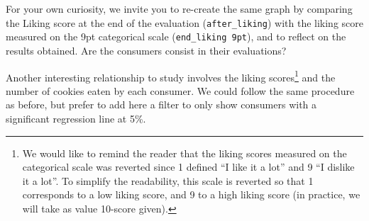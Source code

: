 \documentclass[
]{book}
\newenvironment{Shaded}{\begin{snugshade}}{\end{snugshade}}
\newcommand{\AttributeTok}[1]{\textcolor[rgb]{0.77,0.63,0.00}{#1}}
\newcommand{\ConstantTok}[1]{\textcolor[rgb]{0.00,0.00,0.00}{#1}}
\newcommand{\DecValTok}[1]{\textcolor[rgb]{0.00,0.00,0.81}{#1}}
\newcommand{\FunctionTok}[1]{\textcolor[rgb]{0.00,0.00,0.00}{#1}}
\newcommand{\NormalTok}[1]{#1}
\newcommand{\SpecialCharTok}[1]{\textcolor[rgb]{0.00,0.00,0.00}{#1}}
\newcommand{\StringTok}[1]{\textcolor[rgb]{0.31,0.60,0.02}{#1}}
\begin{document}
\begin{Shaded}
\end{Shaded}

For your own curiosity, we invite you to re-create the same graph by comparing the Liking score at the end of the evaluation (\texttt{after\_liking}) with the liking score measured on the 9pt categorical scale (\texttt{end\_liking\ 9pt}), and to reflect on the results obtained. Are the consumers consist in their evaluations?

Another interesting relationship to study involves the liking scores\footnote{We would like to remind the reader that the liking scores measured on the categorical scale was reverted since 1 defined ``I like it a lot'' and 9 ``I dislike it a lot''. To simplify the readability, this scale is reverted so that 1 corresponds to a low liking score, and 9 to a high liking score (in practice, we will take as value 10-score given).} and the number of cookies eaten by each consumer. We could follow the same procedure as before, but prefer to add here a filter to only show consumers with a significant regression line at 5\%.
\end{document}
